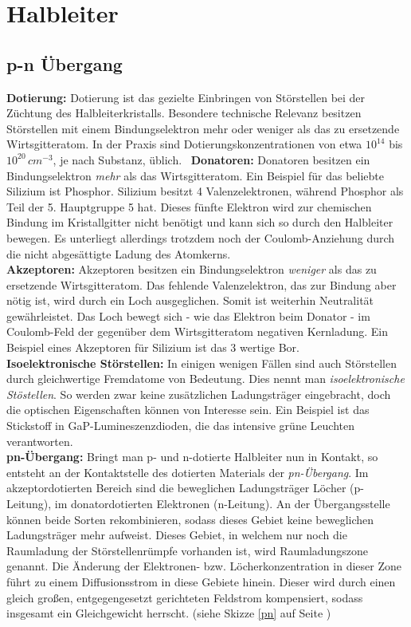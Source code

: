 
\section{Halbleiter}

\subsection*{p-n Übergang}
\textbf{Dotierung:} Dotierung ist das gezielte Einbringen von Störstellen bei der Züchtung des Halbleiterkristalls. Besondere technische Relevanz besitzen Störstellen mit einem Bindungselektron mehr oder weniger als das zu ersetzende Wirtsgitteratom. In der Praxis sind Dotierungskonzentrationen von etwa $10^{14}$ bis $10^{20} \, cm^{-3}$, je nach Substanz, üblich. \
\textbf{Donatoren:} Donatoren besitzen ein Bindungselektron \emph{mehr} als das Wirtsgitteratom. Ein Beispiel für das beliebte Silizium ist Phosphor. Silizium besitzt 4 Valenzelektronen, während Phosphor als Teil der 5. Hauptgruppe 5 hat. Dieses fünfte Elektron wird zur chemischen Bindung im Kristallgitter nicht benötigt und kann sich so durch den Halbleiter bewegen. Es unterliegt allerdings trotzdem noch der Coulomb-Anziehung durch die nicht abgesättigte Ladung des Atomkerns. \\
\textbf{Akzeptoren:} Akzeptoren besitzen ein Bindungselektron \emph{weniger} als das zu ersetzende Wirtsgitteratom. Das fehlende Valenzelektron, das zur Bindung aber nötig ist, wird durch ein Loch ausgeglichen. Somit ist weiterhin Neutralität gewährleistet. Das Loch bewegt sich - wie das Elektron beim Donator - im Coulomb-Feld der gegenüber dem Wirtsgitteratom negativen Kernladung. Ein Beispiel eines Akzeptoren für Silizium ist das 3 wertige Bor.\\
\textbf{Isoelektronische Störstellen:} In einigen wenigen Fällen sind auch Störstellen durch gleichwertige Fremdatome von Bedeutung. Dies nennt man \emph{isoelektronische Stöstellen}. So werden zwar keine zusätzlichen Ladungsträger eingebracht, doch die optischen Eigenschaften können von Interesse sein. Ein Beispiel ist das Stickstoff in GaP-Lumineszenzdioden, die das intensive grüne Leuchten verantworten.\\
\textbf{pn-Übergang:} Bringt man p- und n-dotierte Halbleiter nun in Kontakt, so entsteht an der Kontaktstelle des dotierten Materials der \emph{pn-Übergang}. Im akzeptordotierten Bereich sind die beweglichen Ladungsträger Löcher (p-Leitung), im donatordotierten Elektronen (n-Leitung). An der Übergangsstelle können beide Sorten rekombinieren, sodass dieses Gebiet keine beweglichen Ladungsträger mehr aufweist. Dieses Gebiet, in welchem nur noch die Raumladung der Störstellenrümpfe vorhanden ist, wird Raumladungszone genannt. Die Änderung der Elektronen- bzw. Löcherkonzentration in dieser Zone führt zu einem Diffusionsstrom in diese Gebiete hinein. Dieser wird durch einen gleich großen, entgegengesetzt gerichteten Feldstrom kompensiert, sodass insgesamt ein Gleichgewicht herrscht. (siehe Skizze \ref{pn} auf Seite \pageref{pn})
